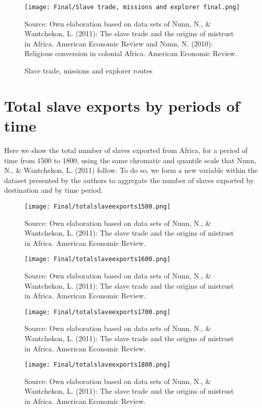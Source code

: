 \documentclass[a4paper,11pt]{article}
\begin{document}
\begin{figure}[H]
\caption{Slave trade, missions and explorer routes}
\centering
\texttt{[image: Final/Slave trade, missions and explorer final.png]}
\label{}
\centering

Source: Own elaboration based on data sets of Nunn, N., \& Wantchekon, L. (2011): The slave trade and the origins of mistrust in Africa. American Economic Review and Nunn, N. (2010): Religious conversion in colonial Africa. American Economic Review.
\end{figure}

\section*{\textcolor{officegreen}{Total slave exports by periods of time}}

Here we show the total number of slaves exported from Africa, for a period of time from 1500 to 1800, using the same chromatic and quantile scale that Nunn, N., \& Wantchekon, L. (2011) follow. To do so, we form a new variable within the dataset presented by the authors to aggregate the number of slaves exported by destination and by time period.

\begin{figure}[H]
\caption{}
\centering
\texttt{[image: Final/totalslaveexports1500.png]}
\label{}
\centering

Source: Own elaboration based on data sets of Nunn, N., \& Wantchekon, L. (2011): The slave trade and the origins of mistrust in Africa. American Economic Review.
\end{figure}

\begin{figure}[H]
\caption{}
\centering
\texttt{[image: Final/totalslaveexports1600.png]}
\label{}
\centering

Source: Own elaboration based on data sets of Nunn, N., \& Wantchekon, L. (2011): The slave trade and the origins of mistrust in Africa. American Economic Review.
\end{figure}

\begin{figure}[H]
\caption{}
\centering
\texttt{[image: Final/totalslaveexports1700.png]}
\label{}
\centering

Source: Own elaboration based on data sets of Nunn, N., \& Wantchekon, L. (2011): The slave trade and the origins of mistrust in Africa. American Economic Review.
\end{figure}

\begin{figure}[H]
\caption{}
\centering
\texttt{[image: Final/totalslaveexports1800.png]}
\label{}
\centering

Source: Own elaboration based on data sets of Nunn, N., \& Wantchekon, L. (2011): The slave trade and the origins of mistrust in Africa. American Economic Review.
\end{figure}
\end{document}
